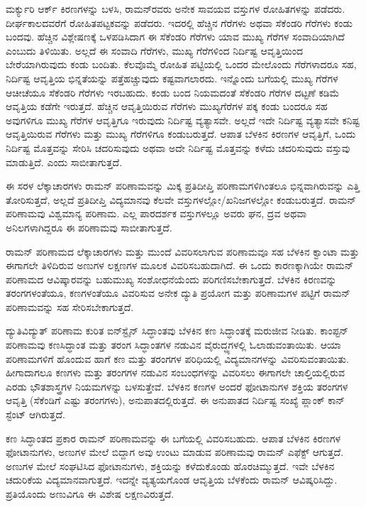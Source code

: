 ಮರ್ಕ್ಯುರಿ ಆರ್ಕ್ ಕಿರಣಗಳನ್ನು ಬಳಸಿ, ರಾಮನ್‍ರವರು ಅನೇಕ ಸಾವಯವ ವಸ್ತುಗಳ ರೋಹಿತಗಳನ್ನು ಪಡೆದರು. ದೀರ್ಘಕಾಲದವರೆಗೆ ರೋಹಿತಪಟ್ಟಕವನ್ನು ಪಡೆದರು. ಇದರಲ್ಲಿ ಹೆಚ್ಚಿನ ಗೆರೆಗಳು ಅಥವಾ ಸೆಕೆಂಡರಿ ಗೆರೆಗಳು ಕಂಡು ಬಂದವು. ಹೆಚ್ಚಿನ ವಿಶ್ಲೇಷಣಕ್ಕೆ ಒಳಪಡಿಸಿದಾಗ ಈ ಸೆಕೆಂಡರಿ ಗೆರೆಗಳು ಯಾವ ಮುಖ್ಯ ಗೆರೆಗಳ ಸಂವಾದಿಯಾಗಿದೆ ಎಂಬುದು ತಿಳಿಯಿತು. ಅಲ್ಲದೆ ಈ ಸಂವಾದಿ ಗೆರೆಗಳು, ಮುಖ್ಯ ಗೆರೆಗಳಿಂದ ನಿರ್ದಿಷ್ಟ ಆವೃತ್ತಿಯಿಂದ ಬೇರೆಯಾಗಿರುವುದು ಕಂಡು ಬಂದಿತು. ಕೆಲವೊಮ್ಮೆ ರೋಹಿತ ಪಟ್ಟಿಯಲ್ಲಿ ಒಂದರ ಮೇಲೊಂದು ಗೆರೆಗಳಾದರೂ ಸಹ, ನಿರ್ದಿಷ್ಟ ಆವೃತ್ತಿಯ ಭಿನ್ನತೆಯನ್ನು ಪತ್ತೆಹಚ್ಚುವುದು ಕಷ್ಟವಾಗಲಾರದು. ಇನ್ನೊಂದು ಬಗೆಯಲ್ಲಿ ಮುಖ್ಯ ಗೆರೆಗಳ ಆಚೀಚೆಯೂ ಸೆಕೆಂಡರಿ ಗೆರೆಗಳು ಇರಬಹುದು. ಕಂಡು ಬಂದ ನಿಯಮದಂತೆ ಸೆಕೆಂಡರಿ ಗೆರೆಗಳ ದಟ್ಟಣೆ ಕಡಿಮೆ ಆವೃತ್ತಿಯ ಕಡೆಗೇ ಇರುತ್ತದೆ. ಹೆಚ್ಚಿನ ಆವೃತ್ತಿಯಿರುವ ಗೆರೆಗಳು ಮುಖ್ಯಗೆರೆಗಳ ಪಕ್ಕ ಕಂಡು ಬಂದರೂ ಸಹ ಅವುಗಳಿಗೂ ಮುಖ್ಯ ಗೆರೆಗಳ ಆವೃತ್ತಿಗೂ ಇರುವುದು ನಿರ್ದಿಷ್ಟ ವ್ಯತ್ಯಾಸವೇ. ಅಲ್ಲದೆ ಇದೇ ನಿರ್ದಿಷ್ಟ ವ್ಯತ್ಯಾಸವೇ ಕನಿಷ್ಟ ಆವೃತ್ತಿಯಿರುವ ಗೆರೆಗಳು ಮತ್ತು ಮುಖ್ಯ ಗೆರೆಗಳಿಗೂ ಕಂಡುಬರುತ್ತದೆ. ಆಪಾತ ಬೆಳಕಿನ ಕಿರಣಗಳ ಆವೃತ್ತಿಗೆ, ಒಂದು ನಿರ್ದಿಷ್ಟ ಮೊತ್ತವನ್ನು ಸೇರಿಸಿ ಚದರಿಸುವುದು ಅಥವಾ ಅದೇ ನಿರ್ದಿಷ್ಟ ಮೊತ್ತವನ್ನು ಕಳೆದು ಚದರಿಸುವುದು ವಸ್ತುವು ಮಾಡುತ್ತಿದೆ. ಎಂದು ಸಾಬೀತಾಗುತ್ತದೆ.

ಈ ಸರಳ ಲೆಕ್ಕಾಚಾರಗಳು ರಾಮನ್ ಪರಿಣಾಮವನ್ನು ಮಿಕ್ಕ ಪ್ರತಿದೀಪ್ತಿ ಪರಿಣಾಮಗಳಿಗಿಂತಲೂ ಭಿನ್ನವಾಗಿರುವನ್ನು ಎತ್ತಿ ತೋರಿಸುತ್ತದೆ, ಅಲ್ಲದೆ ಪ್ರತಿದೀಪ್ತಿ ವಿದ್ಯಮಾನವು ಕೆಲವೇ ವಸ್ತುಗಳಲ್ಲೋ/ಖನಿಜಗಳಲ್ಲೋ ಕಂಡುಬರುತ್ತದೆ. ರಾಮನ್ ಪರಿಣಾಮವು ವಿಶ್ವಮಾನ್ಯ ಪರಿಣಾಮ. ಎಲ್ಲ ಪಾರದರ್ಶಕ ವಸ್ತುಗಳಲ್ಲೂ ಅವರು ಘನ, ದ್ರವ ಅಥವಾ ಅನಿಲಗಳಾಗಿದ್ದರೂ ಈ ಪರಿಣಾಮವು ಸಾಬೀತಾಗುತ್ತದೆ.

ರಾಮನ್ ಪರಿಣಾಮದ ಲೆಕ್ಕಾಚಾರಗಳು ಮತ್ತು ಮುಂದೆ ವಿವರಿಸಲಾಗುವ ಪರಿಣಾಮವೂ ಸಹ ಬೆಳಕಿನ ಕ್ವಾಂಟಾ ಮತ್ತು ಈಗಾಗಲೇ ತಿಳಿದಿರುವ ಅಣುಗಳ ಲಕ್ಷಣಗಳ ಮೂಲಕ ವಿವರಿಸಬಹುದಾಗಿದೆ. ಈ ಒಂದು ಕಾರಣಕ್ಕಾಗಿಯೇ ರಾಮನ್ ಪರಿಣಾಮದ ಆವಿಷ್ಕಾರವನ್ನು ಬಹುಮುಖ್ಯ ಸಂಶೋಧನೆ\-ಯೆಂದು ಪರಿಗಣಿಸಬೇಕಾಗುತ್ತದೆ. ಬೆಳಕಿನ ಕಿರಣವನ್ನು ತರಂಗಗಳಂತೆಯೂ, ಕಣಗಳಂತೆಯೂ ವಿವರಿಸುವ ಅನೇಕ ದ್ಯುತಿ ಪ್ರಯೋಗ ಮತ್ತು ಪರಿಣಾಮಗಳ ಪಟ್ಟಿಗೆ ರಾಮನ್ ಪರಿಣಾಮವನ್ನು ಸಹ ಸೇರಿಸಬೇಕಾಗುತ್ತದೆ.

ದ್ಯುತಿವಿದ್ಯುತ್ ಪರಿಣಾಮ ಕುರಿತ ಐನ್‍ಸ್ಟೈನ್ ಸಿದ್ಧಾಂತವು ಬೆಳಕಿನ ಕಣ ಸಿದ್ಧಾಂತಕ್ಕೆ ಮರುಜೀವ ನೀಡಿತು.  ಕಾಂಪ್ಟನ್ ಪರಿಣಾಮವು ಕಣಸಿದ್ಧಾಂತ ಮತ್ತು ತರಂಗ ಸಿದ್ಧಾಂತಗಳ ನಡುವಿನ ವೈರುದ್ಧ್ಯಗಳಲ್ಲಿ ಓಲಾಡುವಂತಾಯಿತು. ಆಯಾ ಪರಿಣಾಮಗಳಿಗೆ ಹೊಂದುವ ಹಾಗೆ ಕಣ ಮತ್ತು ತರಂಗಗಳ ಪರಿಧಿಯಲ್ಲಿ ವಿದ್ಯಮಾನಗಳನ್ನು ವಿವರಿಸುವಂತಾಯಿತು. ಹೀಗಾದಾಗಲೂ ಕಣಗಳು ಮತ್ತು ತರಂಗಗಳ ನಡುವಿನ ಸಂಬಂಧಗಳನ್ನು ವಿವರಿಸಲು ಈಗಾಗಲೇ ಚಾಲ್ತಿಯಲ್ಲಿರುವ ಎರಡು ಭೌತಶಾಸ್ತ್ರಗಳ ನಿಯಮಗಳನ್ನು ಬಳಸುತ್ತೇವೆ. ಬೆಳಕಿನ ಕಣಗಳ ಅಂದರೆ ಫೋಟಾನುಗಳ ಶಕ್ತಿಯ ತರಂಗಗಳ ಆವೃತ್ತಿ (ಸೆಕೆಂಡಿಗೆ ಎಷ್ಟು ತರಂಗಗಳು), ಅನುಪಾತದಲ್ಲಿರುತ್ತದೆ. ಈ ಅನುಪಾತದ ನಿರ್ದಿಷ್ಟ ಸಂಖ್ಯೆ ಪ್ಲಾಂಕ್ ಕಾನ್ ಸ್ಟೆಂಟ್  ಆಗಿರುತ್ತದೆ.

ಕಣ ಸಿದ್ಧಾಂತದ ಪ್ರಕಾರ ರಾಮನ್ ಪರಿಣಾಮವನ್ನು ಈ ಬಗೆಯಲ್ಲಿ ವಿವರಿಸಬಹುದು. ಆಪಾತ ಬೆಳಕಿನ ಕಿರಣಗಳ ಫೋಟಾನುಗಳು, ಅಣುಗಳ ಮೇಲೆ ಬಿದ್ದಾಗ ಅವು ಉಂಟು ಮಾಡುವ ಪರಿ\-ಣಾಮವು ರಾಮನ್ ಎಫೆಕ್ಟ್ ಆಗುತ್ತದೆ. ಅಣುಗಳ ಮೇಲೆ ಸಂಘಟಿಸಿದ ಫೋಟಾನುಗಳು, ಶಕ್ತಿಯನ್ನು ಕಳೆದುಕೊಂಡು ಹೊರಚಿಮ್ಮುತ್ತದೆ. ಇವೇ ಬೆಳಕಿನ ಚದುರಿಕೆಯ ವಿದ್ಯಮಾನವಾಗುತ್ತದೆ. ಇದನ್ನೇ ವ್ಯತ್ಯಯಗೊಂಡ ಆವೃತ್ತಿಯ ಬೆಳಕೆಂದು ರಾಮನ್ ಆವಿಷ್ಕರಿಸಿದ್ದು. ಪ್ರತಿಯೊಂದು ಅಣುವಿಗೂ ಈ ವಿಶೇಷ ಲಕ್ಷಣವಿರುತ್ತದೆ.

